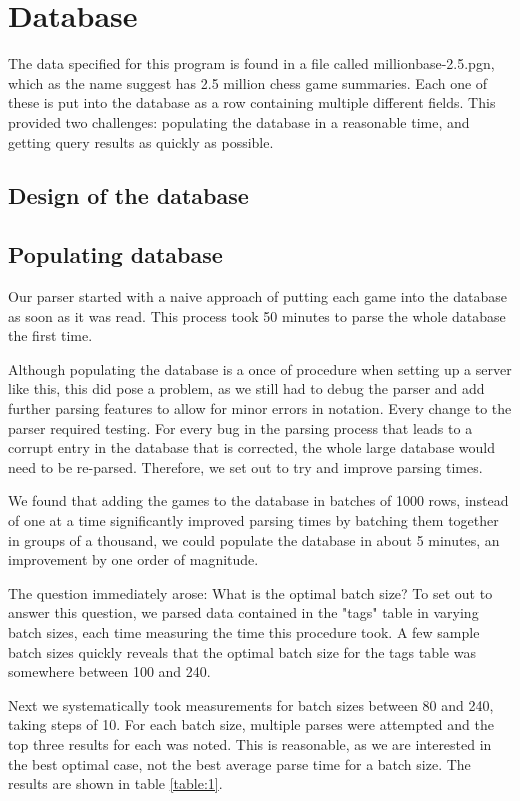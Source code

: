 \documentclass{article}
\begin{document}
\section{Database}
The data specified for this program is found in a file called
millionbase-2.5.pgn, which as the name suggest has 2.5 million chess game
summaries. Each one of these is put into the database as a row containing
multiple different fields.  This provided two challenges:  populating the
database in a reasonable time, and getting query results as quickly as
possible.

\subsection{Design of the database}

\subsection{Populating database}
Our parser started with a naive approach of putting each game into the
database as soon as it was read.  This process took 50 minutes to parse the
whole database the first time.

Although populating the database is a once
of procedure when setting up a server like this, this did pose a problem,
as we still had to debug the parser and add further parsing features to
allow for minor errors in notation. Every change to the parser required
testing.  For every bug in the parsing process that leads to a corrupt
entry in the database that is corrected, the whole large database would
need to be re-parsed.  Therefore, we set out to try and improve parsing
times.

We found that adding the games to the database in batches of 1000 rows, instead
of one at a time significantly improved parsing times by batching them
together in groups of a thousand, we could populate the database in about 5
minutes, an improvement by one order of magnitude.

The question immediately arose:  What is the optimal batch size? To set out
to answer this question, we parsed data contained in the "tags" table in
varying batch sizes, each time measuring the time this procedure took.  A
few sample batch sizes quickly reveals that the optimal batch size for the
tags table was somewhere between 100 and 240.

Next we systematically took measurements for batch sizes between 80 and
240, taking steps of 10.  For each batch size, multiple parses were
attempted and the top three results for each was noted. This is reasonable,
as we are interested in the best optimal case, not the best average parse
time for a batch size.  The results are shown in table \ref{table:1}.
\end{document}
